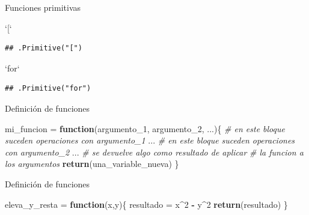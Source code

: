 \documentclass[ignorenonframetext,]{beamer}
\newenvironment{Shaded}{\begin{snugshade}}{\end{snugshade}}
\newcommand{\CommentTok}[1]{\textcolor[rgb]{0.56,0.35,0.01}{\textit{#1}}}
\newcommand{\ControlFlowTok}[1]{\textcolor[rgb]{0.13,0.29,0.53}{\textbf{#1}}}
\newcommand{\DataTypeTok}[1]{\textcolor[rgb]{0.13,0.29,0.53}{#1}}
\newcommand{\DecValTok}[1]{\textcolor[rgb]{0.00,0.00,0.81}{#1}}
\newcommand{\KeywordTok}[1]{\textcolor[rgb]{0.13,0.29,0.53}{\textbf{#1}}}
\newcommand{\NormalTok}[1]{#1}
\newcommand{\OperatorTok}[1]{\textcolor[rgb]{0.81,0.36,0.00}{\textbf{#1}}}
\newcommand{\StringTok}[1]{\textcolor[rgb]{0.31,0.60,0.02}{#1}}
\begin{document}
\begin{frame}[fragile]{Funciones primitivas}
\protect\hypertarget{funciones-primitivas-1}{}

\begin{Shaded}
\begin{Highlighting}[]
\StringTok{`}\DataTypeTok{[}\StringTok{`}
\end{Highlighting}
\end{Shaded}

\begin{verbatim}
## .Primitive("[")
\end{verbatim}

\begin{Shaded}
\begin{Highlighting}[]
\StringTok{`}\DataTypeTok{for}\StringTok{`}
\end{Highlighting}
\end{Shaded}

\begin{verbatim}
## .Primitive("for")
\end{verbatim}

\end{frame}

\begin{frame}[fragile]{Definición de funciones}
\protect\hypertarget{definiciuxf3n-de-funciones}{}

\begin{Shaded}
\begin{Highlighting}[]
\NormalTok{mi_funcion =}\StringTok{ }\ControlFlowTok{function}\NormalTok{(argumento_}\DecValTok{1}\NormalTok{, argumento_}\DecValTok{2}\NormalTok{, ...)\{}
  \CommentTok{# en este bloque suceden operaciones con argumento_1}
\NormalTok{  ...}
  \CommentTok{# en este bloque suceden operaciones con argumento_2}
\NormalTok{  ...}
  \CommentTok{# se devuelve algo como resultado de aplicar}
  \CommentTok{# la funcion a los argumentos}
  \KeywordTok{return}\NormalTok{(una_variable_nueva)}
\NormalTok{\}}
\end{Highlighting}
\end{Shaded}

\end{frame}

\begin{frame}[fragile]{Definición de funciones}
\protect\hypertarget{definiciuxf3n-de-funciones-1}{}

\begin{Shaded}
\begin{Highlighting}[]
\NormalTok{eleva_y_resta =}\StringTok{ }\ControlFlowTok{function}\NormalTok{(x,y)\{}
\NormalTok{  resultado =}\StringTok{ }\NormalTok{x}\OperatorTok{^}\DecValTok{2} \OperatorTok{-}\StringTok{ }\NormalTok{y}\OperatorTok{^}\DecValTok{2}
  \KeywordTok{return}\NormalTok{(resultado)}
\NormalTok{\}}
\end{Highlighting}
\end{Shaded}

\end{frame}
\end{document}
